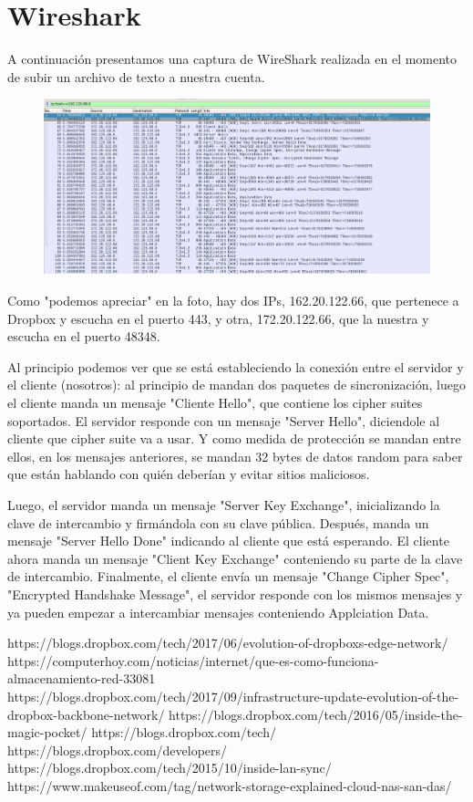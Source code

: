 \section{Wireshark}

A continuación presentamos una captura de WireShark realizada en el momento de subir un archivo de texto a nuestra cuenta.

\begin{figure}[h]
\center
\includegraphics[scale=0.35]{wireshark/wireshark}
\end{figure}

Como "podemos apreciar" en la foto, hay dos IPs, 162.20.122.66, que pertenece a Dropbox y escucha en el puerto 443, y otra, 172.20.122.66, que la nuestra y escucha en el puerto 48348.

Al principio podemos ver que se está estableciendo la conexión entre el servidor y el cliente (nosotros): al principio de mandan dos paquetes de sincronización, luego el cliente manda un mensaje "Cliente Hello", que contiene los cipher suites soportados. El servidor responde con un mensaje "Server Hello", diciendole al cliente que cipher suite va a usar. Y como medida de protección se mandan entre ellos, en los mensajes anteriores, se mandan 32 bytes de datos random para saber que están hablando con quién deberían y evitar sitios maliciosos. 

Luego, el servidor manda un mensaje "Server Key Exchange", inicializando la clave de intercambio y firmándola con su clave pública. Después, manda un mensaje "Server Hello Done" indicando al cliente que está esperando. El cliente ahora manda un mensaje "Client Key Exchange" conteniendo su parte de la clave de intercambio. Finalmente, el cliente envía un mensaje "Change Cipher Spec", "Encrypted Handshake Message", el servidor responde con los mismos mensajes y ya pueden empezar a intercambiar mensajes conteniendo Applciation Data.
\newpage
\begin{thebibliography}{9}
 https://blogs.dropbox.com/tech/2017/06/evolution-of-dropboxs-edge-network/
\bibitem{} https://computerhoy.com/noticias/internet/que-es-como-funciona-almacenamiento-red-33081 
\bibitem{} https://blogs.dropbox.com/tech/2017/09/infrastructure-update-evolution-of-the-dropbox-backbone-network/
\bibitem{} https://blogs.dropbox.com/tech/2016/05/inside-the-magic-pocket/
\bibitem{} https://blogs.dropbox.com/tech/
\bibitem{} https://blogs.dropbox.com/developers/
\bibitem{} https://blogs.dropbox.com/tech/2015/10/inside-lan-sync/
\bibitem{}  https://www.makeuseof.com/tag/network-storage-explained-cloud-nas-san-das/
\end{thebibliography}

